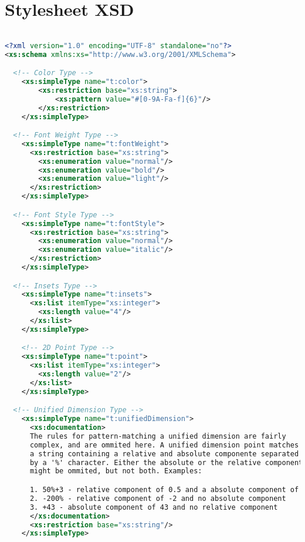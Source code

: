 \appendix
\chapter{Stylesheet XSD}
\pagestyle{headings}

\lstset{frame=none}

\begin{lstlisting}[language=XML]

<?xml version="1.0" encoding="UTF-8" standalone="no"?>
<xs:schema xmlns:xs="http://www.w3.org/2001/XMLSchema">

  <!-- Color Type -->
    <xs:simpleType name="t:color">
        <xs:restriction base="xs:string">
            <xs:pattern value="#[0-9A-Fa-f]{6}"/>
        </xs:restriction>
    </xs:simpleType>

  <!-- Font Weight Type -->
    <xs:simpleType name="t:fontWeight">
      <xs:restriction base="xs:string">
        <xs:enumeration value="normal"/>
        <xs:enumeration value="bold"/>
        <xs:enumeration value="light"/>
      </xs:restriction>
    </xs:simpleType>

  <!-- Font Style Type -->
    <xs:simpleType name="t:fontStyle">
      <xs:restriction base="xs:string">
        <xs:enumeration value="normal"/>
        <xs:enumeration value="italic"/>
      </xs:restriction>
    </xs:simpleType>

  <!-- Insets Type -->
    <xs:simpleType name="t:insets">
      <xs:list itemType="xs:integer">
        <xs:length value="4"/>
      </xs:list>
    </xs:simpleType>

    <!-- 2D Point Type -->
    <xs:simpleType name="t:point">
      <xs:list itemType="xs:integer">
        <xs:length value="2"/>
      </xs:list>
    </xs:simpleType>

  <!-- Unified Dimension Type -->
    <xs:simpleType name="t:unifiedDimension">
      <xs:documentation>
      The rules for pattern-matching a unified dimension are fairly 
      complex, and are ommited here. A unified dimension point matches 
      a string containing a relative and absolute componente separated 
      by a '%' character. Either the absolute or the relative component 
      might be ommited, but not both. Examples:

      1. 50%+3 - relative component of 0.5 and a absolute component of 3
      2. -200% - relative component of -2 and no absolute component
      3. +43 - absolute component of 43 and no relative component
      </xs:documentation>
      <xs:restriction base="xs:string"/>
    </xs:simpleType>


\end{lstlisting}
